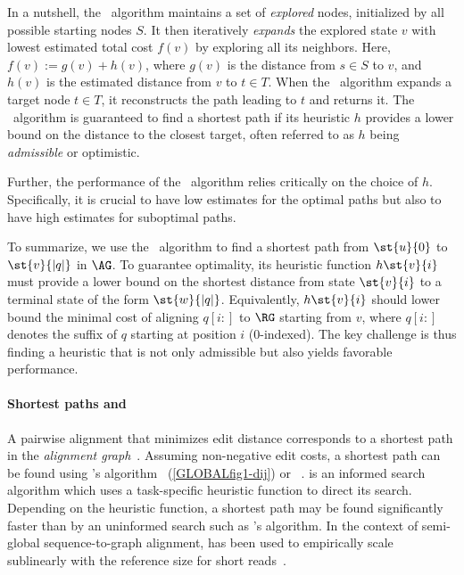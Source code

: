 % 
In a nutshell, the \A~algorithm maintains a set of \emph{explored} nodes,
initialized by all possible starting nodes $S$. It then iteratively
\emph{expands} the explored state $v$ with lowest estimated total cost $f(v)$ by
exploring all its neighbors. Here, $f(v) := g(v) + h(v)$, where $g(v)$ is the
distance from $s \in S$ to $v$, and $h(v)$ is the estimated distance from $v$ to
$t \in T$.
%
When the \A~algorithm expands a target node $t \in T$, it reconstructs the path
leading to $t$ and returns it.
%
%
The \A~algorithm is guaranteed to find a shortest path if its heuristic $h$
provides a lower bound on the distance to the closest target, often referred to
as $h$ being \emph{admissible} or optimistic.

Further, the performance of the \A~algorithm relies critically on the choice of
$h$. Specifically, it is crucial to have low estimates for the optimal paths but
also to have high estimates for suboptimal paths.

%
To summarize, we use the \A~algorithm to find a shortest path from $\st{u}{0}$
to $\st{v}{|q|}$ in $\AG$. To guarantee optimality, its heuristic function
$h\st{v}{i}$ must provide a lower bound on the shortest distance from state
$\st{v}{i}$ to a terminal state of the form $\st{w}{\lvert q \rvert}$.
%
Equivalently, $h\st{v}{i}$ should lower bound the minimal cost of aligning
$q[i{:}]$ to $\RG$ starting from $v$, where $q[i{:}]$ denotes the suffix of $q$
starting at position $i$ ($0$-indexed).
%
The key challenge is thus finding a heuristic that is not only admissible but
also yields favorable performance.

\paragraph{Shortest paths and \A}
A pairwise alignment that minimizes edit distance corresponds to a shortest path
in the \emph{alignment graph}~\citep{vintsyuk1968speech,ukkonen1985algorithms}.
Assuming non-negative edit costs, a shortest path can be found using \dijkstra's
algorithm~\citep{ukkonen1985algorithms} (\cref{GLOBALfig1-dij}) or
\A~\citep{spouge1989speeding}. \A is an informed search algorithm which uses a
task-specific heuristic function to direct its search. Depending on the
heuristic function, a shortest path may be found significantly faster than by an
uninformed search such as \dijkstra's algorithm. In the context of semi-global
sequence-to-graph alignment, \A has been used to empirically scale sublinearly
with the reference size for short reads~\citep{ivanov2020astarix}.
